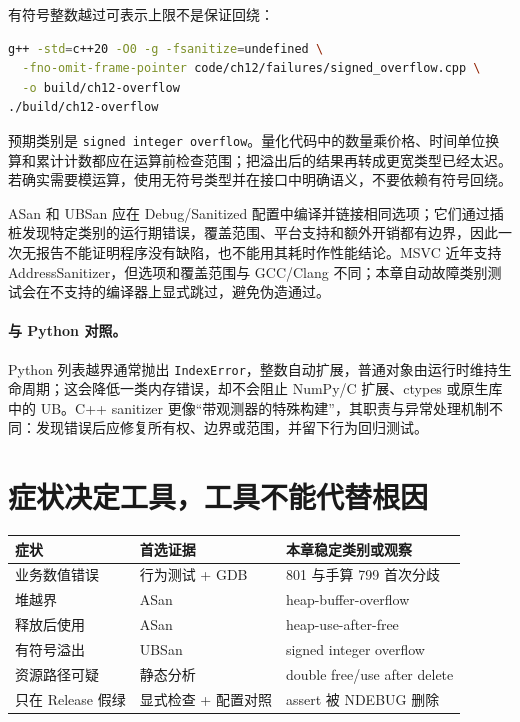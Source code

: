 有符号整数越过可表示上限不是保证回绕：



\begin{lstlisting}[language=bash,numbers=none]
g++ -std=c++20 -O0 -g -fsanitize=undefined \
  -fno-omit-frame-pointer code/ch12/failures/signed_overflow.cpp \
  -o build/ch12-overflow
./build/ch12-overflow
\end{lstlisting}

预期类别是 \texttt{signed integer overflow}。量化代码中的数量乘价格、时间单位换算和累计计数都应在运算前检查范围；把溢出后的结果再转成更宽类型已经太迟。若确实需要模运算，使用无符号类型并在接口中明确语义，不要依赖有符号回绕。

ASan 和 UBSan 应在 Debug/Sanitized 配置中编译并链接相同选项；它们通过插桩发现特定类别的运行期错误，覆盖范围、平台支持和额外开销都有边界，因此一次无报告不能证明程序没有缺陷，也不能用其耗时作性能结论\autocite{clangasan,clangubsan}。MSVC 近年支持 AddressSanitizer，但选项和覆盖范围与 GCC/Clang 不同；本章自动故障类别测试会在不支持的编译器上显式跳过，避免伪造通过。

\paragraph{与 Python 对照。}
Python 列表越界通常抛出 \texttt{IndexError}，整数自动扩展，普通对象由运行时维持生命周期；这会降低一类内存错误，却不会阻止 NumPy/C 扩展、ctypes 或原生库中的 UB。C++ sanitizer 更像“带观测器的特殊构建”，其职责与异常处理机制不同：发现错误后应修复所有权、边界或范围，并留下行为回归测试。

\section{症状决定工具，工具不能代替根因}

\begin{center}
\begin{tabular}{lll}
\toprule
症状 & 首选证据 & 本章稳定类别或观察 \\
\midrule
业务数值错误 & 行为测试 + GDB & 801 与手算 799 首次分歧 \\
堆越界 & ASan & heap-buffer-overflow \\
释放后使用 & ASan & heap-use-after-free \\
有符号溢出 & UBSan & signed integer overflow \\
资源路径可疑 & 静态分析 & double free/use after delete \\
只在 Release 假绿 & 显式检查 + 配置对照 & assert 被 NDEBUG 删除 \\
\bottomrule
\end{tabular}
\end{center}

